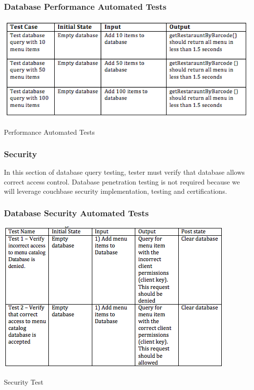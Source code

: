 \documentclass[12pt]{article}
\begin{document}
\subsubsection{Database Performance Automated Tests }
\begin{table}[h]
\includegraphics[width=\textwidth,height=\textheight,keepaspectratio]{performance_tests.png}
  \caption{Performance Automated Tests}
\end{table}

\subsubsection{Security}
In this section of database query testing, tester must verify that database allows correct access control. Database penetration testing is not required because we will leverage couchbase security implementation, testing and certifications.
\subsubsection{Database Security Automated Tests }
\pagebreak
\begin{table}[h]
\includegraphics[width=\textwidth,height=\textheight,keepaspectratio]{security_tests.png}
  \caption{Security Test}
\end{table}
\end{document}

